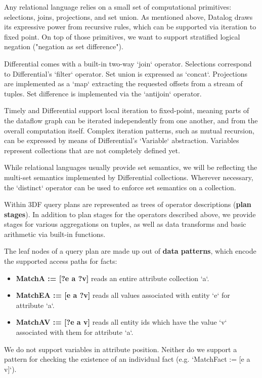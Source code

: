 \documentclass[../index.tex]{subfiles}
\begin{document}
Any relational language relies on a small set of computational
primitives: selections, joins, projections, and set union. As
mentioned above, Datalog draws its expressive power from recursive
rules, which can be supported via iteration to fixed point. On top of
those primitives, we want to support stratified logical negation
("negation as set difference").

Differential comes with a built-in two-way `join` operator. Selections
correspond to Differential's `filter` operator. Set union is expressed
as `concat`. Projections are implemented as a `map` extracting the
requested offsets from a stream of tuples. Set difference is
implemented via the `antijoin` operator.

Timely and Differential support local iteration to fixed-point,
meaning parts of the dataflow graph can be iterated independently from
one another, and from the overall computation itself. Complex
iteration patterns, such as mutual recursion, can be expressed by
means of Differential's `Variable` abstraction. Variables represent
collections that are not completely defined yet.

While relational languages usually provide set semantics, we will be
reflecting the multi-set semantics implemented by Differential
collections. Wherever necessary, the `distinct` operator can be used
to enforce set semantics on a collection.

Within 3DF query plans are represented as trees of operator
descriptions (\textbf{plan stages}). In addition to plan stages for the
operators described above, we provide stages for various aggregations
on tuples, as well as data transforms and basic arithmetic via
built-in functions.

The leaf nodes of a query plan are made up out of \textbf{data patterns},
which encode the supported access paths for facts:

\begin{itemize}
\item \textbf{MatchA := [?e a ?v]} reads an entire attribute collection `a`.
\item \textbf{MatchEA := [e a ?v]} reads all values associated with entity `e`
for attribute `a`.
\item \textbf{MatchAV := [?e a v]} reads all entity ids which have the value `v`
associated with them for attribute `a`.
\end{itemize}

We do not support variables in attribute position. Neither do we
support a pattern for checking the existence of an individual fact
(e.g. `MatchFact := [e a v]`).
\end{document}
